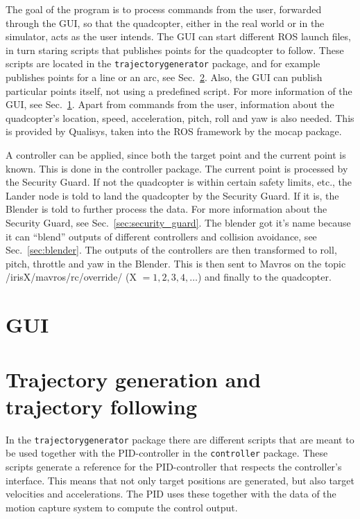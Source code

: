 \documentclass[titlepage,11pt,a4paper]{article}
\begin{document}
The goal of the program is to process commands from the user,
forwarded through the GUI, so that the quadcopter, either in the real
world or in the simulator, acts as the user intends. The GUI can start
different ROS launch files, in turn staring scripts that publishes
points for the quadcopter to follow. These scripts are located in the
\texttt{trajectory\textunderscore generator} package, and for example publishes
points for a line or an arc, see Sec.~\ref{sec:trajectory}. Also, the GUI can publish particular
points itself, not using a predefined script. For more information of
the GUI, see Sec.~\ref{sec:gui}. Apart from commands from the user,
information about the quadcopter's location, speed, acceleration,
pitch, roll and yaw is also needed. This is provided by Qualisys,
taken into the ROS framework by the mocap package.

A controller can be applied, since both the target point and the
current point is known. This is done in the controller package. The
current point is processed by the Security Guard. If not the
quadcopter is within certain safety limits, etc., the Lander node is
told to land the quadcopter by the Security Guard. If it is, the
Blender is told to further process the data. For more information about the Security Guard, see Sec.~\ref{sec:security_guard}. The blender got it's name
because it can ``blend'' outputs of different controllers and
collision avoidance, see Sec.~\ref{sec:blender}. The outputs of the controllers are then
transformed to roll, pitch, throttle and yaw in the Blender. This is
then sent to Mavros on the topic /irisX/mavros/rc/override/ (X $= 1,
2, 3, 4, \dots$) and finally to the quadcopter.


\section{GUI}
\label{sec:gui}


\section{Trajectory generation and trajectory following}
\label{sec:trajectory}

In the \texttt{trajectory\textunderscore generator} package there are
different scripts that are meant to be used together with the
PID-controller in the \texttt{controller} package. These scripts
generate a reference for the PID-controller that respects the
controller's interface. This means that not only target positions are
generated, but also target velocities and accelerations. The PID uses
these together with the data of the motion capture system to compute
the control output.
\end{document}

